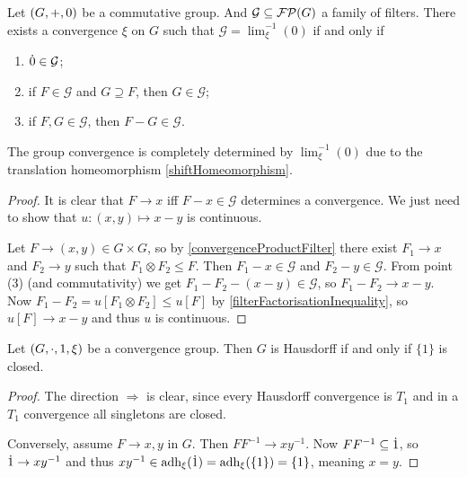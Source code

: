 \begin{proposition} \label{groupConvergenceConstruction}
Let $\left( G, +, 0 \right)$ be a commutative group. And $\mathcal{G} \subseteq \operatorname{\mathcal{FP}}(G)$ a family of filters. There exists a convergence $\xi$ on $G$ such that $\mathcal{G} = \lim^{-1}_\xi(0)$ \textup{if and only if}
\begin{enumerate}
\item $\dot{0} \in \mathcal{G}$;
\item if $F \in \mathcal{G}$ and $G\supseteq F$, then $G\in \mathcal{G}$;
\item if $F,G\in \mathcal{G}$, then $F - G\in \mathcal{G}$.
\end{enumerate}
\end{proposition}
The group convergence is completely determined by $\lim^{-1}_\xi(0)$ due to the translation homeomorphism \ref{shiftHomeomorphism}.
\begin{proof}
It is clear that $F \to x$ iff $F - x \in \mathcal{G}$ determines a convergence. We just need to show that $u: (x,y) \mapsto x - y$ is continuous.

Let $F \to (x,y) \in G\times G$, so by \ref{convergenceProductFilter} there exist $F_1\to x$ and $F_2 \to y$ such that $F_1\otimes F_2 \leq F$. Then $F_1 - x \in \mathcal{G}$ and $F_2 - y \in \mathcal{G}$. From point (3) (and commutativity) we get $F_1 - F_2 - (x - y) \in \mathcal{G}$, so $F_1 - F_2 \to x-y$. Now $F_1 - F_2 = u[F_1\otimes F_2] \leq u[F]$ by \ref{filterFactorisationInequality}, so $u[F] \to x-y$ and thus $u$ is continuous.
\end{proof}

\begin{proposition} \label{HausdorffCriterionConvergenceGroup}
Let $\left( G,\cdot, 1, \xi \right)$ be a convergence group. Then $G$ is Hausdorff \textup{if and only if} $\{1\}$ is closed.
\end{proposition}
\begin{proof}
The direction $\Rightarrow$ is clear, since every Hausdorff convergence is $T_1$ and in a $T_1$ convergence all singletons are closed.

Conversely, assume $F\to x,y$ in $G$. Then $FF^{-1} \to xy^{-1}$. Now $FF^{-1} \subseteq \dot{1}$, so $\dot{1} \to xy^{-1}$ and thus $xy^{-1}\in \operatorname{adh}_\xi(\dot{1}) = \operatorname{adh}_\xi(\{1\}) = \{1\}$, meaning $x = y$.
\end{proof}

